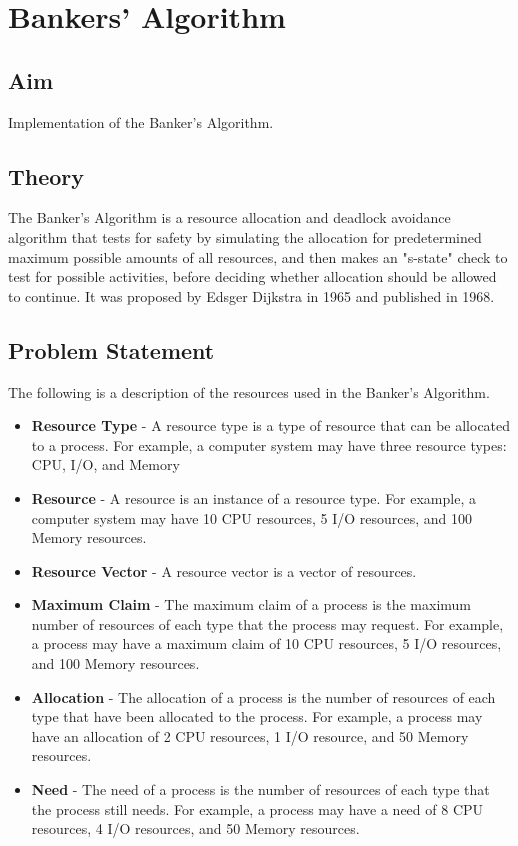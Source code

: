 \section{Bankers' Algorithm}
\label{sec:bankers}

\subsection{Aim}
Implementation of the Banker's Algorithm.

\subsection{Theory}
The Banker's Algorithm is a resource allocation and deadlock
avoidance algorithm that tests for safety by simulating the
allocation for predetermined maximum possible amounts of all
resources, and then makes an "s-state" check to test for possible
activities, before deciding whether allocation should be allowed to continue.
It was proposed by Edsger Dijkstra in 1965 and published in 1968.

\subsection{Problem Statement}

The following is a description of the resources used in the Banker's Algorithm.

\begin{itemize}
	\item \textbf{Resource Type} - A resource type is a type of resource that can be allocated to a process. For example, a computer system may have three resource types: CPU, I/O, and Memory\
	\item \textbf{Resource} - A resource is an instance of a resource type. For example, a computer system may have 10 CPU resources, 5 I/O resources, and 100 Memory resources.
	\item \textbf{Resource Vector} - A resource vector is a vector of resources.
	\item \textbf{Maximum Claim} - The maximum claim of a process is the maximum number of resources of each type that the process may request. For example, a process may have a maximum claim of 10 CPU resources, 5 I/O resources, and 100 Memory resources.
	\item \textbf{Allocation} - The allocation of a process is the number of resources of each type that have been allocated to the process. For example, a process may have an allocation of 2 CPU resources, 1 I/O resource, and 50 Memory resources.
	\item \textbf{Need} - The need of a process is the number of resources of each type that the process still needs. For example, a process may have a need of 8 CPU resources, 4 I/O resources, and 50 Memory resources.
\end{itemize}

